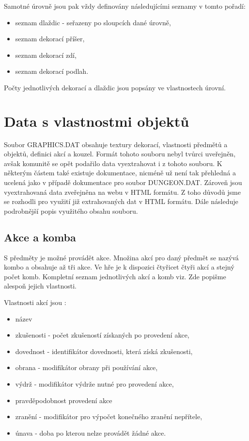 Samotné úrovně jsou pak vždy definovány následujícími seznamy v tomto pořadí:
\begin{itemize}
\item seznam dlaždic - seřazeny po sloupcích dané úrovně,
\item seznam dekorací příšer,
\item seznam dekorací zdí, 
\item seznam dekorací podlah.
\end{itemize}
Počty jednotlivých dekorací a dlaždic jsou popsány ve vlastnostech úrovní.

\section{Data s vlastnostmi objektů }\label{dungeon-properties}

Soubor GRAPHICS.DAT obsahuje textury dekorací, vlastnosti předmětů a objektů, definici akcí a kouzel.
Formát tohoto souboru nebyl tvůrci uveřejněn, avšak komunitě se opět podařilo data
vyextrahovat i z tohoto souboru. K některým částem také existuje dokumentace\cite{DMGraphicsDAT}, 
nicméně už není tak přehledná a ucelená jako v případě dokumentace pro soubor DUNGEON.DAT. Zároveň 
jsou vyextrahovaná data zveřejněna na webu v HTML formátu. Z toho důvodů jsme se rozhodli 
pro využití již extrahovaných dat v HTML formátu. Dále následuje podrobnější popis využitého obsahu souboru.

\subsection{Akce a komba}\label{action-combos}

S předměty je možné provádět akce. Množina akcí pro daný předmět se nazývá kombo a obsahuje 
až tři akce. Ve hře je k dispozici čtyřicet čtyři akcí a stejný počet komb. Kompletní seznam jednotlivých
akcí a komb viz\cite{DMActions}. Zde popišme alespoň jejich vlastnosti.

Vlastnosti akcí jsou :
\begin{itemize}
\item název 
\item zkušenosti - počet zkušeností získaných po provedení akce,
\item dovednost - identifikátor dovednosti, která získá zkušenosti,
\item obrana - modifikátor obrany při používání akce,
\item výdrž - modifikátor výdrže nutné pro provedení akce, 
\item pravděpodobnost provedení akce 
\item zranění - modifikátor pro výpočet konečného zranění nepřítele, 
\item únava - doba po kterou nelze provádět žádné akce. 
\end{itemize}

